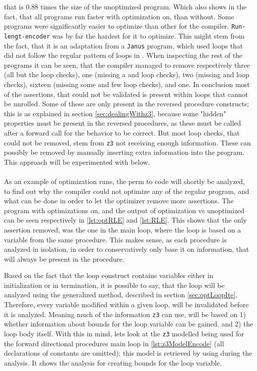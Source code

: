 that is $0.88$ times the size of the unoptimized program.
Which also shows in the fact, that all programs run faster with
optimization on, than without. Some programs were significantly easier to optimize than other
for the \lan compiler. \texttt{Run-lengt-encoder} was by far the hardest for it to optimize.
This might stem from the fact, that it is an adaptation from a \texttt{Janus} program, which
used  loops that did not follow the regular pattern of  loops in \lan.
When inspecting the rest of the programs it can be seen, that the \lan compiler managed to
remove respectively three (all but the loop checks), one (missing a  and loop checks),
two (missing  and loop checks), sixteen (missing some  and few loop checks),
and one. In conclusion most of the assertions, that could not be validated is present within
loops that cannot be unrolled. Some of these are only present in the reversed procedure constructs;
this is as explained in section \ref{sec:dealingWithz3}, because
some "hidden" properties must be present in the reversed procedures, as these must be called after
a forward call for the behavior to be correct. But most loop checks, that could not be removed,
stem from \texttt{z3} not receiving enough information. These can possibly be removed by manually
inserting extra information into the program. This approach will be experimented with below.
\\
\\
As an example of optimization runs, the perm to code will shortly be analyzed, to find
out why the \lan compiler could not optimize any of the regular program, and what can be done
in order to let the optimizer remove more assertions. The program with optimizations on, and the
 output of optimization vs unoptimized can be seen respectively in
\autoref{lst:optRLE} and \autoref{lst:RLE}. This shows that the only assertion removed, was
the one in the main loop, where the loop is based on a variable from the same procedure.
This makes sense, as each procedure is analyzed in isolation, in order to conservatively only
base it on information, that will always be present in the procedure.

Based on the fact that the loop construct contains variables either in initialization or
in termination, it is possible to say, that the loop will be analyzed using the generalized
method, described in section \ref{sec:optLoopIte}. Therefore, every variable modified within
a given loop, will be invalidated before it is analyzed. Meaning much of the information \texttt{z3}
can use, will be based on 1) whether information about bounds for the loop variable can be
gained, and 2) the loop body itself. With this in mind, lets look at the \texttt{z3} modelled
being used for the forward directional  procedures main loop in
\autoref{lst:z3ModelEncode} (all declarations of constants are omitted); this model is retrieved
by using  during the analysis. It shows the analysis for creating bounds
for the loop variable.

